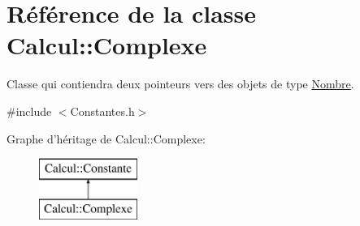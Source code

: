\hypertarget{class_calcul_1_1_complexe}{\section{Référence de la classe Calcul\-:\-:Complexe}
\label{class_calcul_1_1_complexe}
}


Classe qui contiendra deux pointeurs vers des objets de type \hyperlink{class_calcul_1_1_nombre}{Nombre}.  




{\ttfamily \#include $<$Constantes.\-h$>$}

Graphe d'héritage de Calcul\-:\-:Complexe\-:\begin{figure}[H]
\begin{center}
\leavevmode
\includegraphics[height=2.000000cm]{class_calcul_1_1_complexe}
\end{center}
\end{figure}
